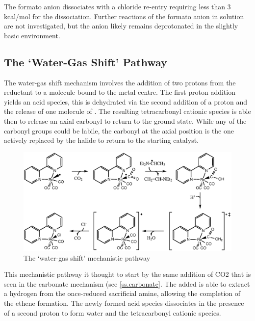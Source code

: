 
The formato anion dissociates with a chloride re-entry requiring less than 3 kcal/mol for the dissociation. Further reactions of the formato anion in solution are not investigated, but the anion likely remains deprotonated in the slightly basic environment. 

\subsection{The `Water-Gas Shift' Pathway}\label{ss.watergas}
The water-gas shift mechanism involves the addition of two protons from the reductant to a  molecule bound to the metal centre. The first proton addition yields an acid species, this is dehydrated via the second addition of a proton and the release of one molecule of . The resulting tetracarbonyl cationic species is able then to release an axial carbonyl to return to the ground state. While any of the carbonyl groups could be labile, the carbonyl at the axial position is the one actively replaced by the halide to return to the starting catalyst\autocite{shaver1992}. 

\begin{figure}[!htb]
 \begin{center}
  \includegraphics[clip=true, width=120mm, keepaspectratio]{images/watergas.eps}
 \end{center}
\caption{The `water-gas shift' mechanistic pathway}
\label{fig.watergas}
\end{figure} 

This mechanistic pathway it thought to start by the same addition of CO2 that is seen in the carbonate mechanism (see \autoref{ss.carbonate}. The added  is able to extract a hydrogen from the once-reduced sacrificial amine, allowing the completion of the ethene formation. The newly formed acid species dissociates in the presence of a second proton to form water and the tetracarbonyl cationic species. 

